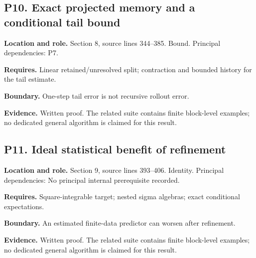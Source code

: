 \documentclass[11pt,letterpaper]{article}
\begin{document}
\par\noindent\begin{minipage}{\textwidth}
\subsection{P10. Exact projected memory and a conditional tail
bound}\label{p10.-exact-projected-memory-and-a-conditional-tail-bound}

\textbf{Location and role.} Section 8, source lines 344--385. Bound.
Principal dependencies: P7.

\textbf{Requires.} Linear retained/unresolved split; contraction and
bounded history for the tail estimate.

\textbf{Boundary.} One-step tail error is not recursive rollout error.

\textbf{Evidence.} Written proof. The related suite contains finite
block-level examples; no dedicated general algorithm is claimed for this
result.
\end{minipage}\par\medskip

\par\noindent\begin{minipage}{\textwidth}
\subsection{P11. Ideal statistical benefit of
refinement}\label{p11.-ideal-statistical-benefit-of-refinement}

\textbf{Location and role.} Section 9, source lines 393--406. Identity.
Principal dependencies: No principal internal prerequisite recorded.

\textbf{Requires.} Square-integrable target; nested sigma algebras;
exact conditional expectations.

\textbf{Boundary.} An estimated finite-data predictor can worsen after
refinement.

\textbf{Evidence.} Written proof. The related suite contains finite
block-level examples; no dedicated general algorithm is claimed for this
result.
\end{minipage}\par\medskip
\end{document}
